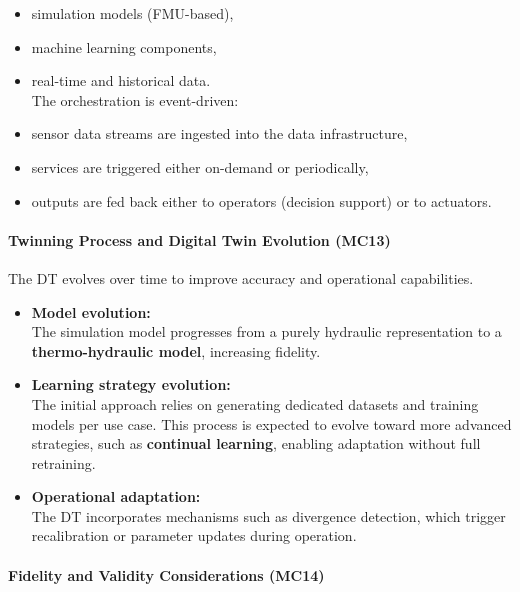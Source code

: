 \documentclass[
]{article}
\providecommand{\tightlist}{%
  \setlength{\itemsep}{0pt}\setlength{\parskip}{0pt}}
\begin{document}
\begin{itemize}
\tightlist
\item
  simulation models (FMU-based),
\item
  machine learning components,
\item
  real-time and historical data.\\
  The orchestration is event-driven:
\item
  sensor data streams are ingested into the data infrastructure,
\item
  services are triggered either on-demand or periodically,
\item
  outputs are fed back either to operators (decision support) or to
  actuators.
\end{itemize}

\paragraph{Twinning Process and Digital Twin Evolution
(MC13)}\label{twinning-process-and-digital-twin-evolution-mc13}

The DT evolves over time to improve accuracy and operational
capabilities.

\begin{itemize}
\tightlist
\item
  \textbf{Model evolution:}\\
  The simulation model progresses from a purely hydraulic representation
  to a \textbf{thermo-hydraulic model}, increasing fidelity.
\item
  \textbf{Learning strategy evolution:}\\
  The initial approach relies on generating dedicated datasets and
  training models per use case. This process is expected to evolve
  toward more advanced strategies, such as \textbf{continual learning},
  enabling adaptation without full retraining.
\item
  \textbf{Operational adaptation:}\\
  The DT incorporates mechanisms such as divergence detection, which
  trigger recalibration or parameter updates during operation.
\end{itemize}

\paragraph{Fidelity and Validity Considerations
(MC14)}\label{fidelity-and-validity-considerations-mc14}
\end{document}
